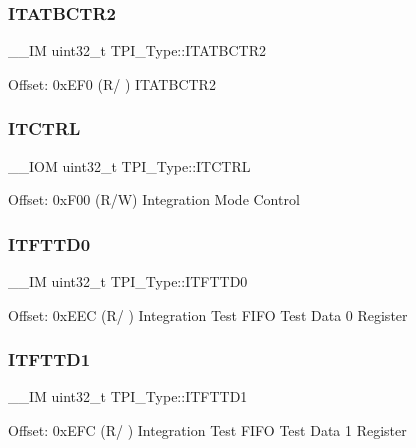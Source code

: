\subsubsection{\texorpdfstring{ITATBCTR2}{ITATBCTR2}\hspace{0.1cm}{\footnotesize\ttfamily [2/2]}}
{\footnotesize\ttfamily \+\_\+\+\_\+\+IM uint32\+\_\+t T\+P\+I\+\_\+\+Type\+::\+I\+T\+A\+T\+B\+C\+T\+R2}

Offset\+: 0x\+E\+F0 (R/ ) I\+T\+A\+T\+B\+C\+T\+R2 \mbox{\label{struct_t_p_i___type_aaa4c823c10f115f7517c82ef86a5a68d}} 
\subsubsection{\texorpdfstring{ITCTRL}{ITCTRL}}
{\footnotesize\ttfamily \+\_\+\+\_\+\+I\+OM uint32\+\_\+t T\+P\+I\+\_\+\+Type\+::\+I\+T\+C\+T\+RL}

Offset\+: 0x\+F00 (R/W) Integration Mode Control \mbox{\label{struct_t_p_i___type_a4c53b48c6bb49037c97742136d14b4f7}} 
\subsubsection{\texorpdfstring{ITFTTD0}{ITFTTD0}}
{\footnotesize\ttfamily \+\_\+\+\_\+\+IM uint32\+\_\+t T\+P\+I\+\_\+\+Type\+::\+I\+T\+F\+T\+T\+D0}

Offset\+: 0x\+E\+EC (R/ ) Integration Test F\+I\+FO Test Data 0 Register \mbox{\label{struct_t_p_i___type_aaf0447dd4b2c16dc1db1e2172c9dac8f}} 
\subsubsection{\texorpdfstring{ITFTTD1}{ITFTTD1}}
{\footnotesize\ttfamily \+\_\+\+\_\+\+IM uint32\+\_\+t T\+P\+I\+\_\+\+Type\+::\+I\+T\+F\+T\+T\+D1}

Offset\+: 0x\+E\+FC (R/ ) Integration Test F\+I\+FO Test Data 1 Register \mbox{\label{struct_t_p_i___type_ae3a3197c7be6ce07b50fd87cbb02f319}} 
